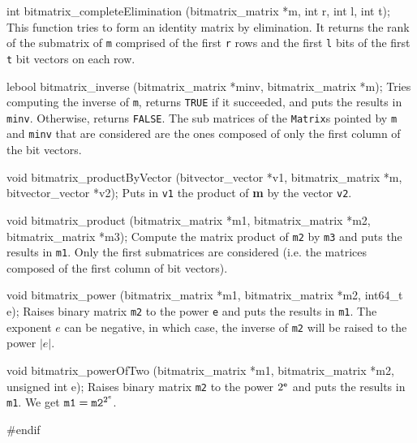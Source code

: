 int bitmatrix_completeElimination (bitmatrix_matrix *m, int r, int l, int t);
\endcode
 \tab
This function tries to form an identity matrix by elimination. 
It returns the rank of the submatrix of {\tt m} comprised of the first 
{\tt r} rows and the first {\tt l} bits of the first {\tt t} bit vectors on each row.
 \endtab
\code

lebool bitmatrix_inverse (bitmatrix_matrix *minv, bitmatrix_matrix *m);
\endcode
\tab
Tries computing the inverse of {\tt m}, returns {\tt TRUE} if it succeeded, and puts the results in {\tt minv}.
Otherwise, returns {\tt FALSE}.
The sub matrices of the {\tt Matrix}s pointed by {\tt m} and {\tt minv} that 
are considered are the ones composed of only the first column of the bit vectors.
 \endtab
\code

void bitmatrix_productByVector (bitvector_vector *v1, bitmatrix_matrix *m, 
                                bitvector_vector *v2);
\endcode
\tab
Puts in {\tt v1} the product of {\bf m} by the vector {\tt v2}.
 \endtab
\code

void bitmatrix_product (bitmatrix_matrix *m1, bitmatrix_matrix *m2,
                        bitmatrix_matrix *m3);
\endcode
\tab
Compute the matrix product of {\tt m2} by {\tt m3} and puts the results in {\tt m1}.
Only the first submatrices are considered (i.e. the matrices composed of the first column of bit vectors). 
\endtab
\code

void bitmatrix_power (bitmatrix_matrix *m1, bitmatrix_matrix *m2, int64_t e);
\endcode
\tab
Raises binary matrix {\tt m2} to the power {\tt e} and puts the results in {\tt m1}.
The exponent $e$ can be negative, in which case, the inverse of {\tt m2}
will be raised to the power $|e|$.
\endtab
\code

void bitmatrix_powerOfTwo (bitmatrix_matrix *m1, bitmatrix_matrix *m2,
                           unsigned int e);
\endcode
\tab
Raises binary matrix {\tt m2} to the power $2^{\tt e}$ and puts the results in {\tt m1}.
We get ${\tt m1} = {\tt m2}^{2^{e}}$.
\endtab

\code\hide
#endif
\endhide\endcode
